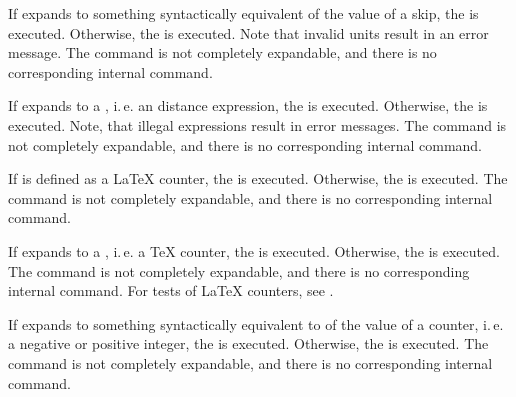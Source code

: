 \begin{Declaration}
\end{Declaration}
If
 expands to something syntactically equivalent of the value
of a skip, the  is executed. Otherwise, the  is executed.  Note that invalid units
result in an error message.  The command is not completely expandable, and
there is no corresponding internal command.%
\EndIndexGroup


\begin{Declaration}
\end{Declaration}
If
 expands to a , i.\,e. an \eTeX{} distance
expression, the  is executed. Otherwise, the  is executed.  Note, that illegal expressions
result in error messages. The command is not completely expandable, and
there is no corresponding internal command.%
\EndIndexGroup


\begin{Declaration}
\end{Declaration}
If
 is defined as a \LaTeX{} counter, the  is
executed. Otherwise, the  is executed. The command is
not completely expandable, and there is no corresponding internal command.%
\EndIndexGroup


\begin{Declaration}
\end{Declaration}
If
 expands to a , i.\,e. a \TeX{} counter, the
 is executed. Otherwise, the  is
executed. The command is not completely expandable, and there is no
corresponding internal command. For tests of \LaTeX{} counters, see
.%
\EndIndexGroup


\begin{Declaration}
\end{Declaration}
If
 expands to something syntactically equivalent to of the
value of a counter, i.\,e. a negative or positive integer, the  is executed. Otherwise, the  is
executed. The command is not completely expandable, and there is no
corresponding internal command.%
\EndIndexGroup


